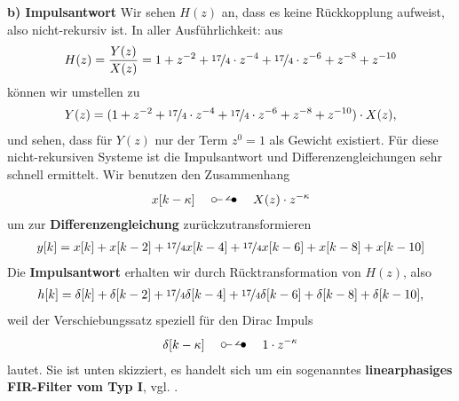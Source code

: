 \begin{ExCalc}
\textbf{b) Impulsantwort}
Wir sehen $H(z)$ an, dass es keine Rückkopplung aufweist, also nicht-rekursiv ist.
In aller Ausführlichkeit: aus
\begin{align}
H(z) = \frac{Y(z)}{X(z)}
= 1            + z^{-2} + \nicefrac{17}{4}\cdot z^{-4}  + \nicefrac{17}{4}\cdot z^{-6} + z^{-8} + z^{-10}
\end{align}
können wir umstellen zu
\begin{align}
Y(z)
= (1            + z^{-2} + \nicefrac{17}{4}\cdot z^{-4}  + \nicefrac{17}{4}\cdot z^{-6} + z^{-8} + z^{-10})
\cdot X(z),
\end{align}
und sehen, dass für $Y(z)$ nur der Term $z^0=1$ als Gewicht existiert.
%
Für diese nicht-rekursiven Systeme ist die Impulsantwort und Differenzengleichungen
sehr schnell ermittelt.
%
Wir benutzen den Zusammenhang
\begin{align}
x[k-\kappa] \quad\ztransf\quad X(z) \cdot z^{-\kappa}
\end{align}
um zur \textbf{Differenzengleichung} zurückzutransformieren
\begin{align}
y[k] = x[k] + x[k-2] + \nicefrac{17}{4} x[k-4] + \nicefrac{17}{4} x[k-6] + x[k-8] + x[k-10]
\end{align}
Die \textbf{Impulsantwort} erhalten wir durch Rücktransformation von $H(z)$, also
\begin{align}
h[k] = \delta[k] + \delta[k-2] + \nicefrac{17}{4} \delta[k-4] + \nicefrac{17}{4} \delta[k-6] + \delta[k-8] + \delta[k-10],
\end{align}
weil der Verschiebungssatz speziell für den Dirac Impuls
\begin{align}
\delta[k-\kappa] \quad\ztransf\quad 1 \cdot z^{-\kappa}
\end{align}
lautet. Sie ist unten skizziert, es handelt sich um ein sogenanntes
\textbf{linearphasiges FIR-Filter vom Typ I}, vgl. \cite{Oppenheim2010, Oppenheim2004}.
%
\begin{center}

\end{center}
\end{ExCalc}
